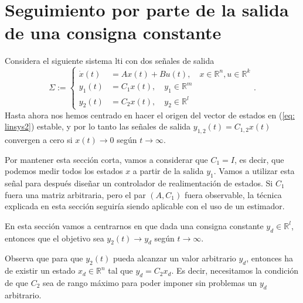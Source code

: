 \section{Seguimiento por parte de la salida de una consigna constante}

Considera el siguiente sistema lti con dos señales de salida
\begin{equation}
	\Sigma := \begin{cases}
	\dot x(t) &= Ax(t) + Bu(t), \quad x\in\mathbb{R}^n, u\in\mathbb{R}^k \\
	y_1(t) &= C_1x(t), \quad y_1\in\mathbb{R}^m \\
	y_2(t) &= C_2x(t), \quad y_2\in\mathbb{R}^l
	\end{cases}.
	\label{eq: linsys2}
\end{equation}
Hasta ahora nos hemos centrado en hacer el origen del vector de estados en (\ref{eq: linsys2}) estable, y por lo tanto las señales de salida $y_{1,2}(t) = C_{1,2}x(t)$ convergen a cero si $x(t) \to 0$ según $t\to\infty$.

Por mantener esta sección corta, vamos a considerar que $C_1 = I$, es decir, que podemos medir todos los estados $x$ a partir de la salida $y_1$. Vamos a utilizar esta señal para después diseñar un controlador de realimentación de estados. Si $C_1$ fuera una matriz arbitraria, pero el par $(A,C_1)$ fuera observable, la técnica explicada en esta sección seguiría siendo aplicable con el uso de un estimador.

En esta sección vamos a centrarnos en que dada una consigna constante $y_d\in\mathbb{R}^l$, entonces que el objetivo sea $y_2(t) \to y_d$ según $t\to\infty$.

\begin{remark}
Observa que para que $y_2(t)$ pueda alcanzar un valor arbitrario $y_d$, entonces ha de existir un estado $x_d\in\mathbb{R}^n$ tal que $y_d = C_2x_d$. Es decir, necesitamos la condición de que $C_2$ sea de rango máximo para poder imponer sin problemas un $y_d$ arbitrario.
\end{remark}

